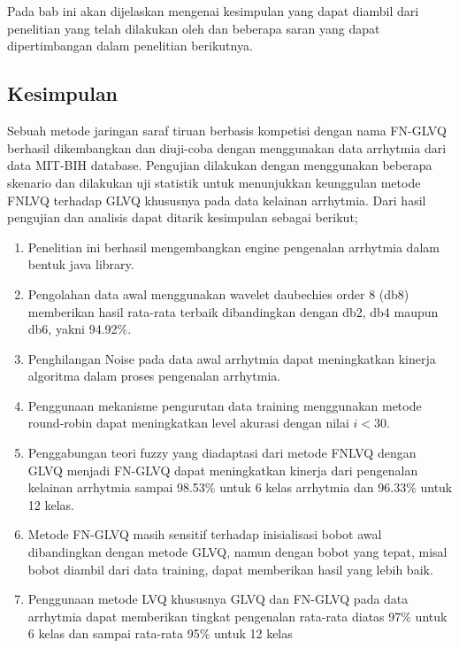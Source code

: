 \chapter{\kesimpulan}
Pada bab ini akan dijelaskan mengenai kesimpulan yang dapat diambil dari
penelitian yang telah dilakukan oleh \saya dan beberapa saran yang dapat
dipertimbangan dalam penelitian berikutnya.

\section{Kesimpulan}
Sebuah metode jaringan saraf tiruan berbasis kompetisi dengan nama
FN-GLVQ berhasil dikembangkan dan diuji-coba dengan menggunakan data arrhytmia
dari data MIT-BIH database. Pengujian dilakukan dengan menggunakan beberapa
skenario dan dilakukan uji statistik untuk menunjukkan keunggulan metode FNLVQ
terhadap GLVQ khususnya pada data kelainan arrhytmia. Dari hasil pengujian dan
analisis dapat ditarik kesimpulan sebagai berikut;
\begin{enumerate}
  \item Penelitian ini berhasil mengembangkan engine pengenalan arrhytmia
  dalam bentuk java library.
  \item Pengolahan data awal menggunakan wavelet daubechies order 8 (db8)
  memberikan hasil rata-rata terbaik dibandingkan dengan db2, db4 maupun
  db6, yakni 94.92\%. 
  \item Penghilangan Noise pada data awal arrhytmia dapat meningkatkan kinerja
  algoritma dalam proses pengenalan arrhytmia.
  \item Penggunaan mekanisme pengurutan data training menggunakan metode
  round-robin dapat meningkatkan level akurasi dengan nilai $i < 30$.
  \item Penggabungan teori fuzzy yang diadaptasi dari metode FNLVQ dengan
  GLVQ menjadi FN-GLVQ dapat meningkatkan kinerja dari pengenalan kelainan
  arrhytmia sampai 98.53\% untuk 6 kelas arrhytmia dan 96.33\% untuk 12 kelas.
  \item Metode FN-GLVQ masih sensitif terhadap inisialisasi bobot awal
  dibandingkan dengan metode GLVQ, namun dengan bobot yang tepat, misal bobot
  diambil dari data training, dapat memberikan hasil yang lebih baik.
  \item Penggunaan metode LVQ khususnya GLVQ dan FN-GLVQ pada data arrhytmia
  dapat memberikan tingkat pengenalan rata-rata diatas 97\% untuk 6 kelas dan
  sampai rata-rata 95\% untuk 12 kelas
\end{enumerate}

